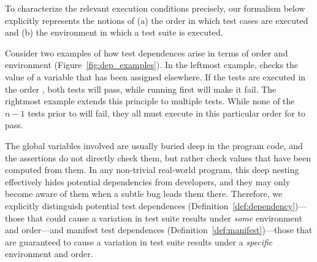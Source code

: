 To characterize the relevant execution conditions precisely, 
our formalism below explicitly represents the notions of
(a) the order in which test cases are executed and (b) the environment in which a test suite is executed.  

Consider two examples 
of how test dependences arise in terms of order and environment (Figure~\ref{fig:dep_examples}).
In the leftmost example,  checks
the value of a variable that has been assigned elsewhere. If the tests
are executed in the order , both tests will pass,
while running  first will make it fail.    The rightmost  example extends this
principle to multiple tests. While none of the $n-1$ tests prior to
 will fail, they all must execute in this particular order
for  to pass. 

The global variables involved are usually buried deep in
the program code, and the assertions do not directly check them,
but rather check values that have been computed from
them. In any non-trivial real-world program, this
deep nesting effectively hides potential dependencies from developers,
and they may only become aware of them when a subtle bug leads them
there.  Therefore, we explicitly
distinguish potential test dependences (Definition~\ref{def:dependency})---those that could cause a variation in test suite results 
under \emph{some} environment and order---and manifest test
dependences (Definition~\ref{def:manifest})---those that are guaranteed to cause a
variation in test suite results under a \emph{specific} environment and order.  



